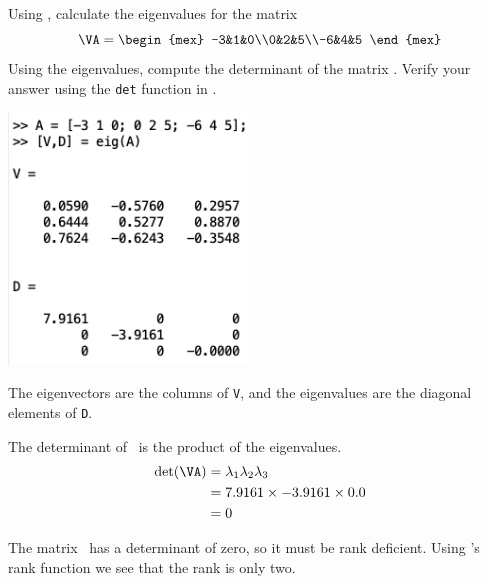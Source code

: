 \documentclass[12pt,ragged]{pajarticle}
\begin{document}
\begin{question}{5}{%
Using \Matlab, calculate the eigenvalues for the matrix
\[ \VA = \begin{mex} -3&1&0\\0&2&5\\-6&4&5 \end{mex} \]
Using the eigenvalues, compute the determinant of the matrix \VA. Verify your answer using the \texttt{det} function in \Matlab.}{
\includegraphics[width=2.5in]{figures/codeQ12_x}

The eigenvectors are the columns of \texttt{V}, and the eigenvalues are the diagonal elements of \texttt{D}.


The determinant of \VA\ is the product of the eigenvalues.
\begin{align*}
	\mathrm{det}(\VA) &= \lambda_1\lambda_2\lambda_3 \\
		&= 7.9161\times-3.9161\times0.0 \\
		&= 0
\end{align*}
 
The matrix \VA\ has a determinant of zero, so it must be rank deficient. Using \Matlab's rank function we see that the rank is only two.
}
\end{question}
\end{document}
